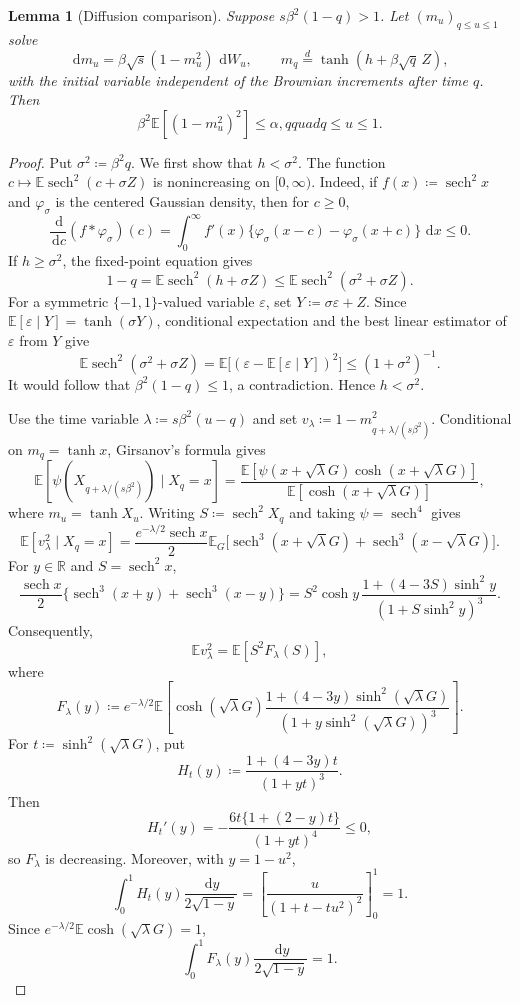 \documentclass[11pt]{article}
\newtheorem{lemma}[theorem]{Lemma}
\numberwithin{equation}{section}
\newcommand{\E}{\mathbb{E}}
\newcommand{\1}{\mathbf 1}
\newcommand{\sech}{\operatorname{sech}}
\newcommand{\dd}{\,\mathrm d}
\begin{document}
\begin{lemma}[Diffusion comparison]
\label{lem:diffusioncomparison}
Suppose $s\beta^2(1-q)>1$.  Let $(m_u)_{q\le u\le1}$ solve
\[
 \dd m_u=\beta\sqrt{s}(1-m_u^2)\,\dd W_u,
 \qquad m_q\stackrel d=\tanh(h+\beta\sqrt q\,Z),
\]
with the initial variable independent of the Brownian increments after
time $q$.  Then
\begin{equation}
 \beta^2\E[(1-m_u^2)^2]\le\alpha,qquad q\le u\le1.
 \label{eq:strictATdiffusion}
\end{equation}
\end{lemma}

\begin{proof}
Put $\sigma^2\coloneqq\beta^2q$.  We first show that
$h<\sigma^2$.  The function
$c\mapsto\E\sech^2(c+\sigma Z)$ is nonincreasing on $[0,\infty)$.
Indeed, if $f(x)\coloneqq\sech^2x$ and $\varphi_\sigma$ is the centered
Gaussian density, then for $c\ge0$,
\[
 \frac{\dd}{\dd c}(f*\varphi_\sigma)(c)
 =\int_0^\infty f'(x)
   \{\varphi_\sigma(x-c)-\varphi_\sigma(x+c)\}\,\dd x\le0.
\]
If $h\ge\sigma^2$, the fixed-point equation gives
\[
 1-q=\E\sech^2(h+\sigma Z)
 \le\E\sech^2(\sigma^2+\sigma Z).
\]
For a symmetric $\{-1,1\}$-valued variable $\varepsilon$, set
$Y\coloneqq\sigma\varepsilon+Z$.  Since
$\E[\varepsilon\mid Y]=\tanh(\sigma Y)$, conditional expectation and
the best linear estimator of $\varepsilon$ from $Y$ give
\[
 \E\sech^2(\sigma^2+\sigma Z)
 =\E\bigl[(\varepsilon-\E[\varepsilon\mid Y])^2\bigr]
 \le(1+\sigma^2)^{-1}.
\]
It would follow that $\beta^2(1-q)\le1$, a contradiction.  Hence
$h<\sigma^2$.

Use the time variable $\lambda\coloneqq s\beta^2(u-q)$ and set
$v_\lambda\coloneqq1-m_{q+\lambda/(s\beta^2)}^2$.
Conditional on $m_q=\tanh x$, Girsanov's formula gives
\[
 \E[\psi(X_{q+\lambda/(s\beta^2)})\mid X_q=x]
 =
 \frac{\E[\psi(x+\sqrt\lambda G)\cosh(x+\sqrt\lambda G)]}
      {\E[\cosh(x+\sqrt\lambda G)]},
\]
where $m_u=\tanh X_u$.  Writing $S\coloneqq\sech^2X_q$ and taking
$\psi=\sech^4$ gives
\[
 \E[v_\lambda^2\mid X_q=x]
 =\frac{e^{-\lambda/2}\sech x}{2}\E_G
 \bigl[\sech^3(x+\sqrt\lambda G)
       +\sech^3(x-\sqrt\lambda G)\bigr].
\]
For $y\in\mathbb R$ and $S=\sech^2x$,
\[
 \frac{\sech x}{2}\{\sech^3(x+y)+\sech^3(x-y)\}
 =S^2\cosh y\,
 \frac{1+(4-3S)\sinh^2y}{(1+S\sinh^2y)^3}.
\]
Consequently,
\begin{equation}
 \E v_\lambda^2=\E[S^2F_\lambda(S)],
 \label{eq:Flambda-representation}
\end{equation}
where
\[
 F_\lambda(y)\coloneqq e^{-\lambda/2}\E\left[
 \cosh(\sqrt\lambda G)
 \frac{1+(4-3y)\sinh^2(\sqrt\lambda G)}
      {(1+y\sinh^2(\sqrt\lambda G))^3}\right].
\]
For $t\coloneqq\sinh^2(\sqrt\lambda G)$, put
\[
 H_t(y)\coloneqq\frac{1+(4-3y)t}{(1+yt)^3}.
\]
Then
\[
 H_t'(y)=-\frac{6t\{1+(2-y)t\}}{(1+yt)^4}\le0,
\]
so $F_\lambda$ is decreasing.  Moreover, with $y=1-u^2$,
\[
 \int_0^1H_t(y)\frac{\dd y}{2\sqrt{1-y}}
 =\left[\frac{u}{(1+t-tu^2)^2}\right]_{0}^{1}=1.
\]
Since $e^{-\lambda/2}\E\cosh(\sqrt\lambda G)=1$,
\begin{equation}
 \int_0^1F_\lambda(y)\frac{\dd y}{2\sqrt{1-y}}=1.
 \label{eq:Fmeanone}
\end{equation}


\end{proof}
\end{document}
